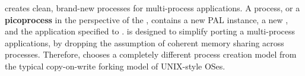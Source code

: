 






\label{sec:abi:proc}


\Thehostabi{} creates clean, brand-new processes
for multi-process applications.
A process, or a {\bf picoprocess} in the perspective of the \libos{}, contains a new PAL instance,
a new \libos{},
and the application specified to \thehostabi{}.
\Thehostabi{} is designed to simplify porting a multi-process applications,
by dropping the assumption of
coherent memory sharing across processes.
Therefore, \thehostabi{} chooses a completely different process creation model
from the typical copy-on-write forking model
of UNIX-style OSes.









